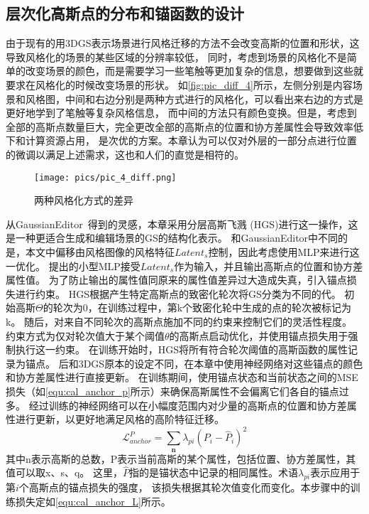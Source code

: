 \subsection{层次化高斯点的分布和锚函数的设计}
由于现有的用3DGS表示场景进行风格迁移的方法不会改变高斯的位置和形状，这导致风格化的场景的某些区域的分辨率较低，
同时，考虑到场景的风格化不是简单的改变场景的颜色，而是需要学习一些笔触等更加复杂的信息，想要做到这些就要求在风格化的时候改变场景的形状。
如\autoref{fig:pic_diff_4}所示，左侧分别是内容场景和风格图，中间和右边分别是两种方式进行的风格化，可以看出来右边的方式是更好地学到了笔触等复杂风格信息，
而中间的方法只有颜色变换。但是，考虑到全部的高斯点数量巨大，完全更改全部的高斯点的位置和协方差属性会导致效率低下和计算资源占用，
是次优的方案。本章认为可以仅对外层的一部分点进行位置的微调以满足上述需求，这也和人们的直觉是相符的。
\begin{figure}[htb]
    \centering
    \texttt{[image: pics/pic\_4\_diff.png]}
    \caption{\label{fig:pic_diff_4}两种风格化方式的差异}
\end{figure}
从GaussianEditor~\cite{chen2024gaussianeditor}得到的灵感，本章采用分层高斯飞溅 (HGS)进行这一操作，这是一种更适合生成和编辑场景的GS的结构化表示。
和GaussianEditor中不同的是，本文中偏移由风格图像的风格特征$Latent_s$控制，因此考虑使用MLP来进行这一优化。
提出的小型MLP接受$Latent_s$作为输入，并且输出高斯点的位置和协方差属性值。
为了防止输出的属性值同原来的属性值差异过大造成失真，引入锚点损失进行约束。
HGS根据产生特定高斯点的致密化轮次将GS分类为不同的代。
初始高斯$\Theta$的轮次为0，在训练过程中，第k个致密化轮中生成的点的轮次被标记为k。
随后，对来自不同轮次的高斯点施加不同的约束来控制它们的灵活性程度。
约束方式为仅对轮次值大于某个阈值$\theta$的高斯点启动优化，并使用锚点损失用于强制执行这一约束。
在训练开始时，HGS将所有符合轮次阈值的高斯函数的属性记录为锚点。
后和3DGS原本的设定不同，在本章中使用神经网络对这些锚点的颜色和协方差属性进行直接更新。
在训练期间，使用锚点状态和当前状态之间的MSE损失（如\autoref{equ:cal_anchor_p}所示）来确保高斯属性不会偏离它们各自的锚点过多。
经过训练的神经网络可以在小幅度范围内对少量的高斯点的位置和协方差属性进行更新，以更好地满足风格的高阶特征迁移。
\begin{equation}
    \label{equ:cal_anchor_p}
    \mathcal{L}_{anchor}^P=\sum_{\mathbf{n}}\lambda_{pi}(P_i-\widehat{P}_i)^2
\end{equation}
其中n表示高斯的总数，P表示当前高斯的某个属性，包括位置、协方差属性，其值可以取x、s、q。
这里，$\widehat{P}$指的是锚状态中记录的相同属性。术语$\lambda_{pi}$表示应用于第$i$个高斯点的锚点损失的强度，
该损失根据其轮次值变化而变化。本步骤中的训练损失定如\autoref{equ:cal_anchor_L}所示。

